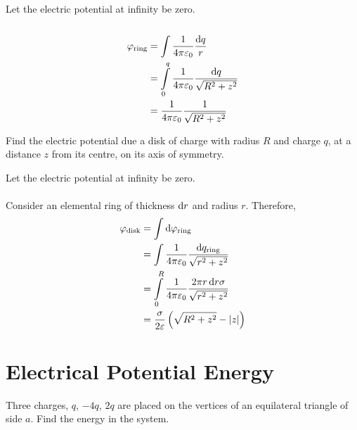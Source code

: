 \documentclass[fleqn, a4paper, 12pt, twoside]{article}
\theoremstyle{definition}
\theoremstyle{theorem}
\begin{document}
\begin{solution}
	Let the electric potential at infinity be zero.\\
	~\\
	\begin{align*}
		\varphi_{\textnormal{ring}} &= \int \dfrac{1}{4 \pi \varepsilon_0} \dfrac{\dif q}{r}\\
		&= \int\limits_{0}^{q} \dfrac{1}{4 \pi \varepsilon_0} \dfrac{\dif q}{\sqrt{R^2 + z^2}}\\
		&= \dfrac{1}{4 \pi \varepsilon_0} \dfrac{1}{\sqrt{R^2 + z^2}}
	\end{align*}
\end{solution}

\begin{question}
	Find the electric potential due a disk of charge with radius $R$ and charge $q$, at a distance $z$ from its centre, on its axis of symmetry.
\end{question}

\begin{solution}
	Let the electric potential at infinity be zero.\\
	~\\
	Consider an elemental ring of thickness $\dif r$ and radius $r$.
	Therefore,
	\begin{align*}
		\varphi_{\textnormal{disk}} &= \int \dif \varphi_{\textnormal{ring}}\\
		&= \int \dfrac{1}{4 \pi \varepsilon_0} \dfrac{\dif q_{\textnormal{ring}}}{\sqrt{r^2 + z^2}}\\
		&= \int\limits_{0}^{R} \dfrac{1}{4 \pi \varepsilon_0} \dfrac{2 \pi r \dif r \sigma}{\sqrt{r^2 + z^2}}\\
		&= \dfrac{\sigma}{2 \varepsilon} \left( \sqrt{R^2 + z^2} - |z| \right)
	\end{align*}
\end{solution}

\section{Electrical Potential Energy}

\begin{question}
	Three charges, $q$, $-4q$, $2q$ are placed on the vertices of an equilateral triangle of side $a$. Find the energy in the system.
\end{question}
\end{document}
